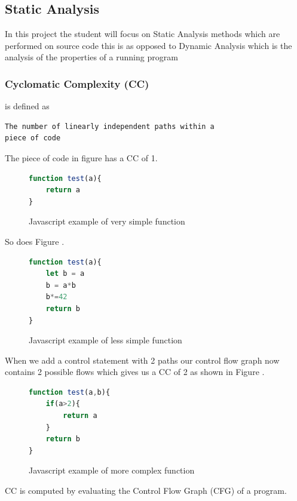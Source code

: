 \subsection{Static Analysis}
In this project the student will focus on Static Analysis methods which are performed on source code this
is as opposed to Dynamic Analysis which is the analysis of the properties of a running program \cite{dynamicAnalysis}
\subsubsection{\textbf{Cyclomatic Complexity (CC)}}
is defined as
\begin{verbatim}
The number of linearly independent paths within a 
piece of code
\end{verbatim}
The piece of code in figure  has a CC of 1.
\begin{figure}[h]
    \begin{lstlisting}[language=Javascript]
function test(a){
    return a
}
        \end{lstlisting}
    \caption{Javascript example of very simple function}
    \label{fig:simple-func1}
\end{figure}
So does Figure .
\begin{figure}[h]
    \begin{lstlisting}[language=Javascript]
function test(a){
    let b = a
    b = a*b
    b*=42
    return b
}
        \end{lstlisting}
    \caption{Javascript example of less simple function}
    \label{fig:simple-func2}
\end{figure}
When we add a control statement with 2 paths our control flow graph now contains 2 possible flows which gives us a CC of 2 as shown in Figure .
\begin{figure}[h]
    \begin{lstlisting}[language=Javascript]
function test(a,b){
    if(a>2){
        return a
    }
    return b
}
        \end{lstlisting}
    \caption{Javascript example of more complex function}
    \label{fig:complex-func}
\end{figure}
\newline
CC is computed by evaluating the Control Flow Graph (CFG) of a program.
